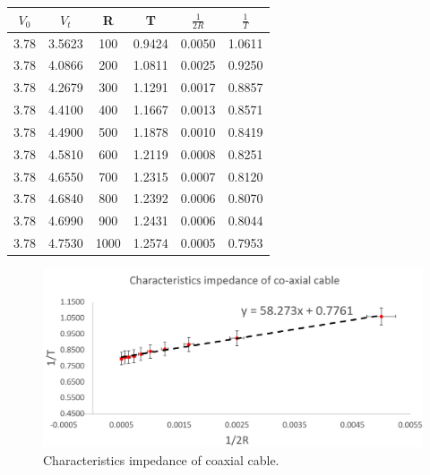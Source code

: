 \documentclass[12pt,a4paper,bold]{thesis}
\theoremstyle{thm}
\theoremstyle{definition}
\begin{document}
\begin{center}
\begin{tabular}{||c c c c c c||} 
 \hline
 $V_0$ & $V_t$ & R & T & $\frac{1}{2R}$ & $\frac{1}{T}$\\ [0.5ex] 
 \hline\hline
 3.78 & 3.5623 & 100 & 0.9424 & 0.0050 & 1.0611\\
 3.78 & 4.0866 & 200 & 1.0811 & 0.0025  & 0.9250\\
 3.78 & 4.2679 & 300 & 1.1291 & 0.0017  & 0.8857\\
 3.78 & 4.4100 & 400 & 1.1667 & 0.0013 & 0.8571\\
 3.78 & 4.4900 & 500 & 1.1878 & 0.0010 & 0.8419\\
 3.78 & 4.5810 & 600 & 1.2119 & 0.0008 & 0.8251\\
 3.78 & 4.6550 & 700 & 1.2315 & 0.0007 & 0.8120\\
 3.78 & 4.6840 & 800 & 1.2392 & 0.0006 & 0.8070\\
 3.78 & 4.6990 & 900 & 1.2431 & 0.0006 & 0.8044\\ 
 3.78 & 4.7530 & 1000 & 1.2574 & 0.0005 & 0.7953\\ [1ex] 
 \hline
\end{tabular}
\end{center}
\begin{figure}[H]
	\centering
   \includegraphics[width=13cm]{Images/63.png} 
   \caption{Characteristics impedance of coaxial cable.}
\end{figure}
\end{document}
